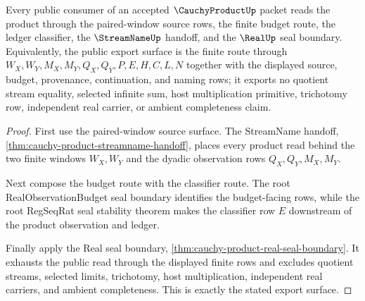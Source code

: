 \begin{theorem}
\label{thm:cauchy-product-public-interface-export}
Every public consumer of an accepted $\CauchyProductUp$ packet reads the product through the paired-window source rows, the finite budget route, the ledger classifier, the $\StreamNameUp$ handoff, and the $\RealUp$ seal boundary. Equivalently, the public export surface is the finite route through $W_X,W_Y,M_X,M_Y,Q_X,Q_Y,P,E,H,C,L,N$ together with the displayed source, budget, provenance, continuation, and naming rows; it exports no quotient stream equality, selected infinite sum, host multiplication primitive, trichotomy row, independent real carrier, or ambient completeness claim.
\end{theorem}
\begin{proof}
First use the paired-window source surface. The StreamName handoff, \autoref{thm:cauchy-product-streamname-handoff}, places every product read behind the two finite windows $W_X,W_Y$ and the dyadic observation rows $Q_X,Q_Y,M_X,M_Y$.

Next compose the budget route with the classifier route. The root RealObservationBudget seal boundary identifies the budget-facing rows, while the root RegSeqRat seal stability theorem makes the classifier row $E$ downstream of the product observation and ledger.

Finally apply the Real seal boundary, \autoref{thm:cauchy-product-real-seal-boundary}. It exhausts the public read through the displayed finite rows and excludes quotient streams, selected limits, trichotomy, host multiplication, independent real carriers, and ambient completeness. This is exactly the stated export surface.
\end{proof}

